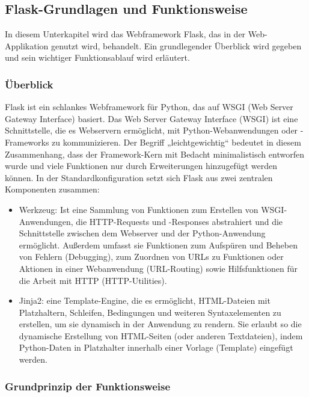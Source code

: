 \subsection{Flask-Grundlagen und Funktionsweise}\label{subsec:flask-grundlagen-und-funktionsweise}

In diesem Unterkapitel wird das Webframework Flask, das in der Web-Applikation genutzt wird, behandelt.
Ein grundlegender Überblick wird gegeben und sein wichtiger Funktionsablauf wird erläutert.

\subsubsection{Überblick}

Flask ist ein schlankes Webframework für Python, das auf WSGI (Web Server Gateway Interface) basiert.
Das Web Server Gateway Interface (WSGI) ist eine Schnittstelle, die es Webservern ermöglicht, mit Python-Webanwendungen oder -Frameworks zu kommunizieren.
Der Begriff „leichtgewichtig“ bedeutet in diesem Zusammenhang, dass der Framework-Kern mit Bedacht minimalistisch entworfen wurde und viele Funktionen nur durch Erweiterungen hinzugefügt werden können.
In der Standardkonfiguration setzt sich Flask aus zwei zentralen Komponenten zusammen: \cite{FlaskDocumentation}
\begin{itemize}

    \item Werkzeug: Ist eine Sammlung von Funktionen zum Erstellen von WSGI-Anwendungen, die HTTP-Requests und -Responses abstrahiert und die Schnittstelle zwischen dem Webserver und der Python-Anwendung ermöglicht.  Außerdem umfasst sie Funktionen zum Aufspüren und Beheben von Fehlern (Debugging), zum Zuordnen von URLs zu Funktionen oder Aktionen in einer Webanwendung (URL-Routing) sowie Hilfsfunktionen für die Arbeit mit HTTP (HTTP-Utilities).

    \item Jinja2: eine Template-Engine, die es ermöglicht, HTML-Dateien mit Platzhaltern, Schleifen, Bedingungen und weiteren Syntaxelementen zu erstellen, um sie dynamisch in der Anwendung zu rendern. Sie erlaubt so die dynamische Erstellung von HTML-Seiten (oder anderen Textdateien), indem Python-Daten in Platzhalter innerhalb einer Vorlage (Template) eingefügt werden.

\end{itemize}


\subsubsection{Grundprinzip der Funktionsweise}

